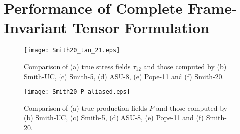 \section{Performance of Complete Frame-Invariant Tensor Formulation} 
\label{sec:10B}

\lipsum[3] 


%
\begin{figure}
	\begin{center} \hspace{1.75cm}
	\texttt{[image: Smith20\_tau\_21.eps]}
	\caption{Comparison of (a) true stress fields $\tau_{12}$ and those computed by (b) Smith-UC, (c) Smith-5, (d) ASU-8, (e) Pope-11 and (f) Smith-20.}
	\label{F:Smith20_tau}
	\end{center}
\end{figure}
%
%


\lipsum[4-5] 


%
\begin{figure}
	\begin{center} \hspace{1.75cm}
	\texttt{[image: Smith20\_P\_aliased.eps]}
	\caption{Comparison of (a) true production fields $P$ and those computed by (b) Smith-UC, (c) Smith-5, (d) ASU-8, (e) Pope-11 and (f) Smith-20.}
	\label{F:Smith20_P}
	\end{center}
\end{figure}
%
%

\lipsum[4-5] 



